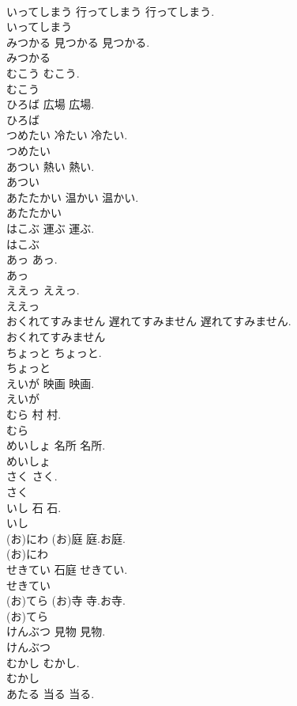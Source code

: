 \documentclass[8pt]{extreport}
\begin{document}
\begin{CJK}{UTF8}{min}
\\	いってしまう	行ってしまう	行ってしまう.	
\\	いってしまう
\\	みつかる	見つかる	見つかる.	
\\	みつかる
\\	むこう		むこう.	
\\	むこう
\\	ひろば	広場	広場.	
\\	ひろば
\\	つめたい	冷たい	冷たい.	
\\	つめたい
\\	あつい	熱い	熱い.	
\\	あつい
\\	あたたかい	温かい	温かい.	
\\	あたたかい
\\	はこぶ	運ぶ	運ぶ.	
\\	はこぶ
\\	あっ		あっ.	
\\	あっ
\\	ええっ		ええっ.	
\\	ええっ
\\	おくれてすみません	遅れてすみません	遅れてすみません.	
\\	おくれてすみません
\\	ちょっと		ちょっと.	
\\	ちょっと
\\	えいが	映画	映画.	
\\	えいが
\\	むら	村	村.	
\\	むら
\\	めいしょ	名所	名所.	
\\	めいしょ
\\	さく		さく.	
\\	さく
\\	いし	石	石.	
\\	いし
\\	(お)にわ	(お)庭	庭.お庭.	
\\	(お)にわ
\\	せきてい	石庭	せきてい.	
\\	せきてい
\\	(お)てら	(お)寺	寺.お寺.	
\\	(お)てら
\\	けんぶつ	見物	見物.	
\\	けんぶつ
\\	むかし		むかし.	
\\	むかし
\\	あたる	当る	当る.	

\end{CJK}
\end{document}
